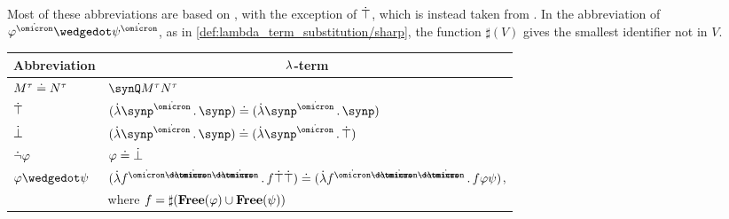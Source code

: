 \begin{remark}
\begin{thmenum}
    Most of these abbreviations are based on , with the exception of \( \dot{\top} \), which is instead taken from . In the abbreviation of \( \varphi^{\syn\omicron} \synwedge \psi^{\syn\omicron} \), as in \cref{def:lambda_term_substitution/sharp}, the function \( \sharp(V) \) gives the smallest identifier not in \( V \).

    \begin{table}
      \begin{center}
        \begin{tabular}{l l}
          \toprule
          \multicolumn{1}{c}{Abbreviation} & \multicolumn{1}{c}{\( {\mathrm \lambda} \)-term}                                                                                                                                                                \\
          \midrule
          \( M^\tau \doteq N^\tau \)       & \( \synQ M^\tau N^\tau \)                                                                                                                                                                                \\
          \( \dot{\top} \)                    & \( (\qabs {\synp^{\syn\omicron}} \synp) \syneq (\qabs {\synp^{\syn\omicron}} \synp) \)                                                                                                                   \\
          \( \dot{\bot} \)                    & \( (\qabs {\synp^{\syn\omicron}} \synp) \syneq (\qabs {\synp^{\syn\omicron}} \syntop) \)                                                                                                                 \\
          \( \dot{\neg} \varphi \)            & \( \varphi \doteq \dot{\bot} \)                                                                                                                                                                             \\
          \( \varphi \synwedge \psi \)     & \( (\qabs {f^{\syn\omicron \synimplies \syn\omicron \synimplies \syn\omicron}} f \syntop \syntop) \syneq (\qabs {f^{\syn\omicron \synimplies \syn\omicron \synimplies \syn\omicron}} f \varphi \psi) \), \\
                                           & \quad where \( f = \sharp(\op*{Free}(\varphi) \cup \op*{Free}(\psi)) \)                                                                                                                                  \\

\end{tabular}
\end{center}
\end{table}
\end{thmenum}
\end{remark}
